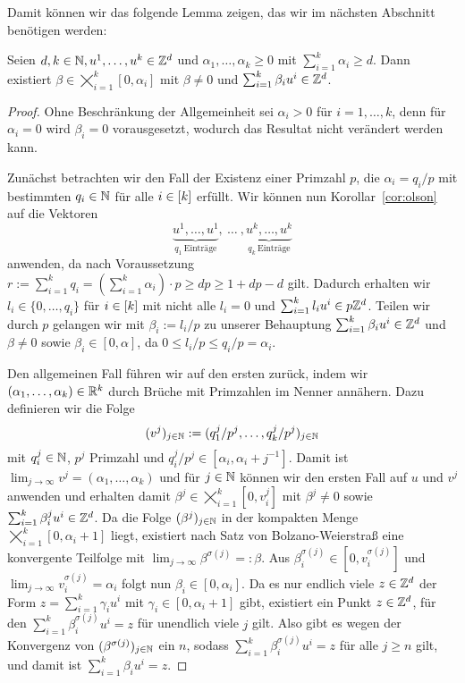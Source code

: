 Damit können wir das folgende Lemma zeigen, das wir im nächsten Abschnitt benötigen werden:

\begin{lemma}\label{lem:olson}
	Seien $d,k\in\mathbb{N}, u^1,\dots, u^k\in\mathbb{Z}^d$ und $\alpha_1,\dots,\alpha_k\geq0$ mit $\sum_{i=1}^k \alpha_i\geq d$.
	Dann existiert $\beta\in\bigtimes_{i=1}^k[0,\alpha_i]$ mit $\beta\neq0$ und $\sum_{i=1}^k\beta_i u^i \in\mathbb{Z}^d$.
\end{lemma}
\begin{proof}
	\newcommand{\bbeta}{\tilde{\beta}}
	Ohne Beschränkung der Allgemeinheit sei $\alpha_i>0$ für $i=1,\dots,k$, denn für $\alpha_i=0$ wird $\beta_i=0$ vorausgesetzt, wodurch das Resultat nicht verändert werden kann.
	
	Zunächst betrachten wir den Fall der Existenz einer Primzahl $p$, die $\alpha_i=q_i / p$ mit bestimmten $q_i\in\mathbb{N}$ für alle $i\in[k]$ erfüllt.
	Wir können nun Korollar~\ref{cor:olson} auf die Vektoren
	$$\underbrace{u^1,\dots,u^1}_{q_1~\text{Einträge}},~\dots~,\underbrace{u^k,\dots,u^k}_{q_k~\text{Einträge}}$$
	anwenden, da nach Voraussetzung $r:=\sum_{i=1}^k q_i=(\sum_{i=1}^k \alpha_i)\cdot p\geq dp \geq 1+dp-d$ gilt.
	Dadurch erhalten wir $l_i\in\{0,\dots,q_i\}$ für $i\in[k]$ mit nicht alle $l_i=0$ und $\sum_{i=1}^k l_i u^i\in p\mathbb{Z}^d$.
	Teilen wir durch $p$ gelangen wir mit $\beta_i := l_i/p$ zu unserer Behauptung $\sum_{i=1}^k \beta_i u^i\in\mathbb{Z}^d$ und $\beta\neq0$ sowie $\beta_i\in[0,\alpha]$, da $0\leq l_i/p\leq q_i/p=\alpha_i$.
	
	Den allgemeinen Fall führen wir auf den ersten zurück, indem wir $(\alpha_1,\dots,\alpha_k)\in\mathbb{R}^k$ durch Brüche mit Primzahlen im Nenner annähern.
	Dazu definieren wir die Folge 
	$$
	(v^j)_{j\in\mathbb{N}}:=(q^j_1/p^j,\dots,q^j_k/p^j)_{j\in\mathbb{N}}$$
	mit $q^j_i\in\mathbb{N}$, $p^j$ Primzahl und $q^j_i/p^j\in[\alpha_i, \alpha_i+j^{-1}]$.
	Damit ist $\lim_{j\rightarrow\infty}v^j=(\alpha_1,\dots,\alpha_k)$ und für $j\in\mathbb{N}$ können wir den ersten Fall auf $u$ und $v^j$ anwenden und erhalten damit $\beta^j\in\bigtimes_{i=1}^k[0,v^j_i]$ mit $\beta^j\neq0$ sowie $\sum_{i=1}^k\beta^j_i u^i \in\mathbb{Z}^d$.
	Da die Folge $(\beta^j)_{j\in\mathbb{N}}$ in der kompakten Menge $\bigtimes_{i=1}^k[0,\alpha_i+1]$ liegt, existiert nach Satz von Bolzano-Weierstraß eine konvergente Teilfolge mit $\lim_{j\to\infty} \beta^{\sigma(j)}=:\beta$.
	Aus $\beta^{\sigma(j)}_i\in[0,v^{\sigma(j)}_i]$ und $\lim_{j\to\infty}v^{\sigma(j)}_i=\alpha_i$ folgt nun $\beta_i\in[0,\alpha_i]$.
	Da es nur endlich viele $z\in\mathbb{Z}^d$ der Form $z=\sum_{i=1}^k\gamma_i u^i$ mit $\gamma_i\in[0,\alpha_i+1]$ gibt, existiert ein Punkt $z\in\mathbb{Z}^d$, für den $\sum_{i=1}^k \beta^{\sigma(j)}_i u^i=z$ für unendlich viele $j$ gilt.
	Also gibt es wegen der Konvergenz von $(\beta^{\sigma(j)})_{j\in\mathbb{N}}$ ein $n$, sodass $\sum_{i=1}^k\beta^{\sigma(j)}_i u^i=z$ für alle $j\geq n$ gilt, und damit ist $\sum_{i=1}^k\beta_i u^i=z$.
	

\end{proof}
